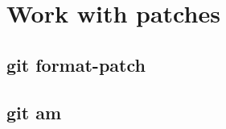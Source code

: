 \section{Work with patches}
\begin{frame}[fragile]
    \slidetitle
\end{frame}

\subsection{git format-patch}
\begin{frame}[fragile]
    \subslidetitle
\end{frame}

\subsection{git am}
\begin{frame}[fragile]
    \subslidetitle
\end{frame}

